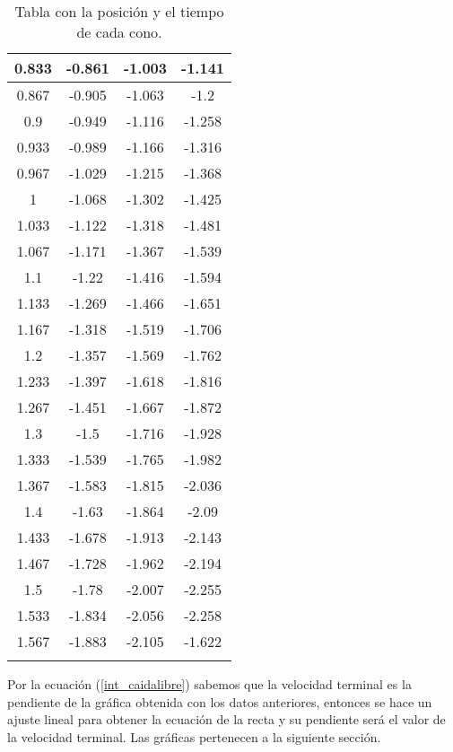\begin{longtable}{|c|c|c|c|}
        \hline 0.833 & -0.861 & -1.003 & -1.141 \\
        \hline 0.867 & -0.905 & -1.063 & -1.2 \\
        \hline 0.9 & -0.949 & -1.116 & -1.258 \\
        \hline 0.933 & -0.989 & -1.166 & -1.316 \\
        \hline 0.967 & -1.029 & -1.215 & -1.368 \\
        \hline 1 & -1.068 & -1.302 & -1.425 \\
        \hline 1.033 & -1.122 & -1.318 & -1.481 \\
        \hline 1.067 & -1.171 & -1.367 & -1.539 \\
        \hline 1.1 & -1.22 & -1.416 & -1.594 \\
        \hline 1.133 & -1.269 & -1.466 & -1.651 \\
        \hline 1.167 & -1.318 & -1.519 & -1.706 \\
        \hline 1.2 & -1.357 & -1.569 & -1.762 \\
        \hline 1.233 & -1.397 & -1.618 & -1.816 \\
        \hline 1.267 & -1.451 & -1.667 & -1.872 \\
        \hline 1.3 & -1.5 & -1.716 & -1.928 \\
        \hline 1.333 & -1.539 & -1.765 & -1.982 \\
        \hline 1.367 & -1.583 & -1.815 & -2.036 \\
        \hline 1.4 & -1.63 & -1.864 & -2.09 \\
        \hline 1.433 & -1.678 & -1.913 & -2.143 \\
        \hline 1.467 & -1.728 & -1.962 & -2.194 \\
        \hline 1.5 & -1.78 & -2.007 & -2.255 \\
        \hline 1.533 & -1.834 & -2.056 & -2.258 \\
        \hline 1.567 & -1.883 & -2.105 & -1.622 \\
        \hline
    \caption{Tabla con la posición y el tiempo de cada cono.}
    \label{tab:postiemcono}
\end{longtable}

Por la ecuación (\ref{int_caidalibre}) sabemos que la velocidad terminal es la
pendiente de la gráfica obtenida con los datos anteriores, entonces
se hace un ajuste lineal para obtener la ecuación de la recta y
su pendiente será el valor de la velocidad terminal. Las gráficas
pertenecen a la siguiente sección.

